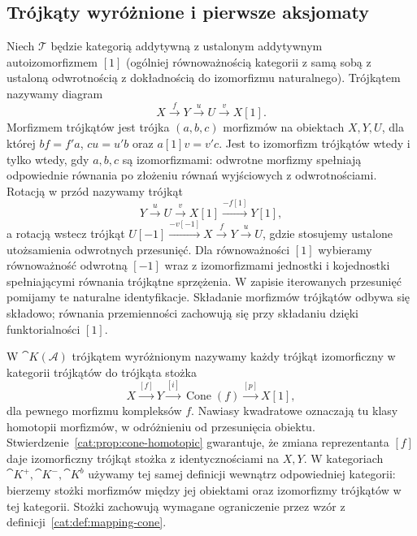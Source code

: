 \subsection{Trójkąty wyróżnione i pierwsze aksjomaty}
\begin{definicja}\label{cat:def:triangle}
Niech $\mathcal T$ będzie kategorią addytywną z ustalonym addytywnym autoizomorfizmem $[1]$ (ogólniej równoważnością kategorii z samą sobą z ustaloną odwrotnością z dokładnością do izomorfizmu naturalnego). Trójkątem nazywamy diagram
\[
 X\xrightarrow f Y\xrightarrow u U\xrightarrow v X[1].
\]
Morfizmem trójkątów jest trójka $(a,b,c)$ morfizmów na obiektach $X,Y,U$, dla której $bf=f'a$, $cu=u'b$ oraz $a[1]v=v'c$. Jest to izomorfizm trójkątów wtedy i tylko wtedy, gdy $a,b,c$ są izomorfizmami: odwrotne morfizmy spełniają odpowiednie równania po złożeniu równań wyjściowych z odwrotnościami. Rotacją w przód nazywamy trójkąt
\[
 Y\xrightarrow u U\xrightarrow v X[1]\xrightarrow{-f[1]}Y[1],
\]
a rotacją wstecz trójkąt $U[-1]\xrightarrow{-v[-1]}X\xrightarrow f Y\xrightarrow u U$, gdzie stosujemy ustalone utożsamienia odwrotnych przesunięć. Dla równoważności $[1]$ wybieramy równoważność odwrotną $[-1]$ wraz z izomorfizmami jednostki i kojednostki spełniającymi równania trójkątne sprzężenia. W zapisie iterowanych przesunięć pomijamy te naturalne identyfikacje. Składanie morfizmów trójkątów odbywa się składowo; równania przemienności zachowują się przy składaniu dzięki funktorialności $[1]$.
\end{definicja}
\begin{definicja}\label{cat:def:cone-triangle}
W $\cat{K}(\mathcal A)$ trójkątem wyróżnionym nazywamy każdy trójkąt izomorficzny w kategorii trójkątów do trójkąta stożka
\begin{equation}\label{cat:eq:cone-triangle}
 X\xrightarrow{[f]}Y\xrightarrow{[i]}\operatorname{Cone}(f)
 \xrightarrow{[p]}X[1],
\end{equation}
dla pewnego morfizmu kompleksów $f$. Nawiasy kwadratowe oznaczają tu klasy homotopii morfizmów, w odróżnieniu od przesunięcia obiektu. Stwierdzenie~\ref{cat:prop:cone-homotopic} gwarantuje, że zmiana reprezentanta $[f]$ daje izomorficzny trójkąt stożka z identycznościami na $X,Y$. W kategoriach $\cat K^+,\cat K^-,\cat K^b$ używamy tej samej definicji wewnątrz odpowiedniej kategorii: bierzemy stożki morfizmów między jej obiektami oraz izomorfizmy trójkątów w tej kategorii. Stożki zachowują wymagane ograniczenie przez wzór z definicji~\ref{cat:def:mapping-cone}.
\end{definicja}
